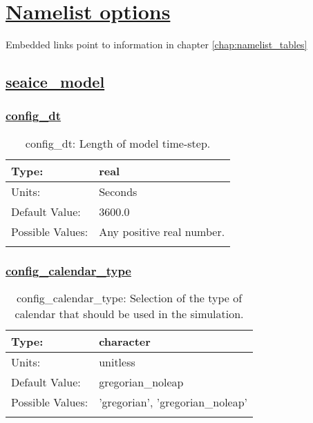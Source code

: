 \chapter[Namelist options]{\hyperref[chap:namelist_tables]{Namelist options}}
\label{chap:namelist_sections}
Embedded links point to information in chapter \ref{chap:namelist_tables}
\section[seaice\_model]{\hyperref[sec:nm_tab_seaice_model]{seaice\_model}}
\label{sec:nm_sec_seaice_model}
\subsection[config\_dt]{\hyperref[sec:nm_tab_seaice_model]{config\_dt}}
\label{subsec:nm_sec_config_dt}
\begin{center}
\begin{longtable}{| p{2.0in} || p{4.0in} |}
    \hline
    Type: & real \\
    \hline
    Units: & \si{Seconds} \\
    \hline
    Default Value: & 3600.0 \\
    \hline
    Possible Values: & Any positive real number. \\
    \hline
    \caption{config\_dt: Length of model time-step.}
\end{longtable}
\end{center}
\subsection[config\_calendar\_type]{\hyperref[sec:nm_tab_seaice_model]{config\_calendar\_type}}
\label{subsec:nm_sec_config_calendar_type}
\begin{center}
\begin{longtable}{| p{2.0in} || p{4.0in} |}
    \hline
    Type: & character \\
    \hline
    Units: & \si{unitless} \\
    \hline
    Default Value: & gregorian\_noleap \\
    \hline
    Possible Values: & 'gregorian', 'gregorian\_noleap' \\
    \hline
    \caption{config\_calendar\_type: Selection of the type of calendar that should be used in the simulation.}
\end{longtable}
\end{center}
